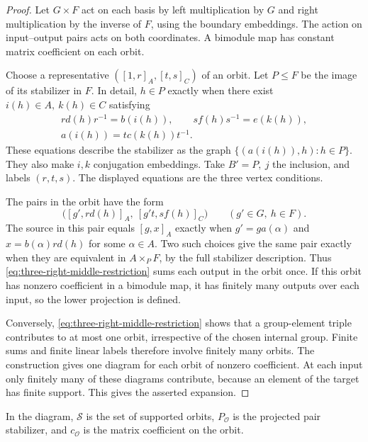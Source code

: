 \documentclass[11pt,a4paper]{article}
\numberwithin{equation}{section}
\theoremstyle{definition}
\begin{document}
\begin{proof}
Let \(G\times F\) act on each basis by left multiplication by \(G\)
and right multiplication by the inverse of \(F\), using the boundary
embeddings. The action on input--output pairs acts on both coordinates.
A bimodule map has constant matrix coefficient on each orbit.

Choose a representative \(([1,r]_A,[t,s]_C)\) of an orbit.
Let \(P\le F\) be the image of its stabilizer in \(F\).
In detail, \(h\in P\) exactly when there exist \(i(h)\in A,\ k(h)\in C\)
satisfying
\[
 \begin{gathered}
 r d(h)r^{-1}=b(i(h)),\qquad
 s f(h)s^{-1}=e(k(h)),\\
 a(i(h))=t c(k(h))t^{-1}.
 \end{gathered}
\]
These equations describe the stabilizer as the graph
\(\{(a(i(h)),h):h\in P\}\). They also make \(i,k\) conjugation
embeddings. Take \(B'=P,\ j\) the inclusion, and labels \((r,t,s)\).
The displayed equations are the three vertex conditions.

The pairs in the orbit have the form
\[
 \bigl([g',r d(h)]_A,\ [g't,s f(h)]_C\bigr)
 \qquad(g'\in G,\ h\in F).
\]
The source in this pair equals \([g,x]_A\) exactly when
\(g'=ga(\alpha)\) and \(x=b(\alpha)r d(h)\) for some \(\alpha\in A\).
Two such choices give the same pair exactly when they are equivalent
in \(A\times_P F\), by the full stabilizer description.
Thus \eqref{eq:three-right-middle-restriction} sums each output in
the orbit once. If this orbit has nonzero coefficient in a bimodule
map, it has finitely many outputs over each input, so the lower
projection is defined.

Conversely, \eqref{eq:three-right-middle-restriction} shows that a
group-element triple contributes to at most one orbit, irrespective
of the chosen internal group. Finite sums and finite linear labels
therefore involve finitely many orbits. The construction gives one
diagram for each orbit of nonzero coefficient. At each input only
finitely many of these diagrams contribute, because an element of
the target has finite support. This gives the asserted expansion.
\end{proof}

In the diagram, \(\mathcal S\) is the set of supported orbits,
\(P_{\mathcal O}\) is the projected pair stabilizer, and
\(c_{\mathcal O}\) is the matrix coefficient on the orbit.
\end{document}
